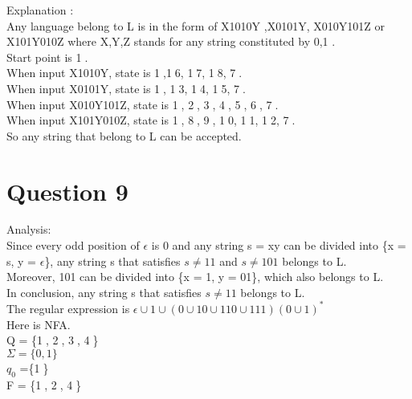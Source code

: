 \documentclass[a4paper]{article}
\begin{document}
Explanation :\\
Any language belong to L is in the form of X1010Y ,X0101Y, X010Y101Z or X101Y010Z where X,Y,Z stands for any string constituted by {0,1} .\\
Start point is \textcircled{1}.\\
When input X1010Y, state is \textcircled{1},\textcircled{16}, \textcircled{17}, \textcircled{18}, \textcircled{7}.\\
When input X0101Y, state is \textcircled{1}, \textcircled{13}, \textcircled{14}, \textcircled{15}, \textcircled{7}.\\
When input X010Y101Z, state is \textcircled{1}, \textcircled{2}, \textcircled{3}, \textcircled{4}, \textcircled{5}, \textcircled{6}, \textcircled{7}.\\
When input X101Y010Z, state is \textcircled{1}, \textcircled{8}, \textcircled{9}, \textcircled{10}, \textcircled{11}, \textcircled{12}, \textcircled{7}.\\
So any string that belong to L can be accepted.


\section{Question 9}
Analysis:\\
Since every odd position of $\epsilon$ is 0 and any string s = xy can be divided into \{x = s, y = $\epsilon$\}, any string s that satisfies $s\neq 11$ and $s\neq 101$ belongs to L. \\
Moreover, 101 can be divided into \{x = 1, y = 01\}, which also belongs to L. \\
In conclusion, any string s that satisfies $s\neq 11$ belongs to L.\\
The regular expression is $\epsilon \cup 1 \cup (0 \cup 10 \cup 110 \cup 111)(0 \cup 1) ^{*}$\\
Here is NFA.\\
Q = \{\textcircled{1}, \textcircled{2}, \textcircled{3}, \textcircled{4}\}\\
$\Sigma = \{0, 1\}$\\
$q_{0}$ =\{\textcircled{1}\}\\
F = \{\textcircled{1}, \textcircled{2}, \textcircled{4}\}\\
\end{document}
